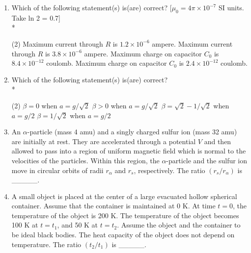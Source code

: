 \documentclass{article}
\begin{document}
\begin{enumerate}
    \item Which of the following statement(s) is(are) correct? [$\mu_0 = 4\pi \times 10^{-7}$ SI units. Take ln 2 = 0.7] \\*
        \begin{tasks}(2)
            \task Maximum current through $R$ is $1.2 \times 10^{-6}$ ampere.
            \task Maximum current through $R$ is $3.8 \times 10^{-6}$ ampere.
            \task Maximum charge on capacitor $C_0$ is $8.4 \times 10^{-12}$ coulomb.
            \task Maximum charge on capacitor $C_0$ is $2.4 \times 10^{-12}$ coulomb.
        \end{tasks}
        \begin{center}
        \end{center}
        
    \item Which of the following statement(s) is(are) correct? \\*
        \begin{tasks}(2)
            \task $\beta = 0$ when $a = g/\sqrt{2}$
            \task $\beta > 0$ when $a = g/\sqrt{2}$
            \task $\beta = \sqrt{2}-1/\sqrt{2}$ when $a = g/2$
            \task $\beta = 1/\sqrt{2}$ when $a = g/2$
        \end{tasks}
        \begin{center}
        \end{center}

    \item An $\alpha$-particle (mass 4 amu) and a singly charged sulfur ion (mass 32 amu) are initially at rest. They are accelerated through a potential $V$ and then allowed to pass into a region of uniform magnetic field which is normal to the velocities of the particles. Within this region, the $\alpha$-particle and the sulfur ion move in circular orbits of radii $r_{\alpha}$ and $r_{s}$, respectively. The ratio $(r_{s}/r_{\alpha})$ is \_\_\_\_\_.
    
    
    
    \item A small object is placed at the center of a large evacuated hollow spherical container. Assume that the container is maintained at 0 K. At time $t = 0$, the temperature of the object is 200 K. The temperature of the object becomes 100 K at $t = t_{1}$, and 50 K at $t = t_{2}$. Assume the object and the container to be ideal black bodies. The heat capacity of the object does not depend on temperature. The ratio $(t_{2}/t_{1})$ is \_\_\_\_\_.
\end{enumerate}
\end{document}
